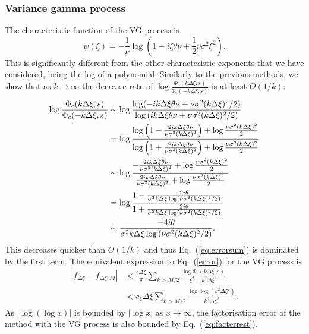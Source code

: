 \documentclass[11pt,a4paper]{article}
\begin{document}
\subsubsection{Variance gamma process}\label{sec:error_fact_VG}

The characteristic function of the VG process is
\begin{equation}
\psi(\xi) = -\frac{1}{\nu}\log\left(1-i\xi\theta\nu+\frac{1}{2}\nu\sigma^2\xi^2\right).
\end{equation}
This is significantly different from the other characteristic exponents that we have considered, being the log of a polynomial. Similarly to the previous methods, we show that as $k\rightarrow\infty$ the decrease rate of $\log \frac{\Phi_{\mathrm{c}}(k\Delta\xi,s)}{\Phi_{\mathrm{c}}(-k\Delta\xi,s)}$ is at least $O(1/k)$:
\begin{align}
\log \frac{\Phi_{\mathrm{c}}(k\Delta\xi,s)}{\Phi_{\mathrm{c}}(-k\Delta\xi,s)}&\sim\log\frac{\log(-ik\Delta\xi\theta\nu+\nu\sigma^2(k\Delta\xi)^2/2)}{\log\left(ik\Delta\xi\theta\nu+\nu\sigma^2(k\Delta\xi)^2/2\right)}\nonumber\\
&=\log\frac{\log\left(1-\frac{2ik\Delta\xi\theta\nu}{\nu\sigma^2(k\Delta\xi)^2}\right)+\log\frac{ \nu\sigma^2(k\Delta\xi)^2}{2}}{\log\left(1+\frac{2ik\Delta\xi\theta\nu}{\nu\sigma^2(k\Delta\xi)^2}\right)+\log\frac{ \nu\sigma^2(k\Delta\xi)^2}{2}}\nonumber\\
&\sim\log\frac{-\frac{2ik\Delta\xi\theta\nu}{\nu\sigma^2(k\Delta\xi)^2}+\log\frac{\nu\sigma^2(k\Delta\xi)^2}{2}}{\frac{2ik\Delta\xi\theta\nu}{\nu\sigma^2(k\Delta\xi)^2}+\log\frac{\nu\sigma^2(k\Delta\xi)^2}{2}}\nonumber\\
&=\log\frac{1-\frac{2i\theta}{\sigma^2k\Delta\xi\log\left( \nu\sigma^2(k\Delta\xi)^2\right/2)}}{1+\frac{2i \theta}{\sigma^2k\Delta\xi\log\left( \nu\sigma^2(k\Delta\xi)^2/2\right)}}\nonumber\\
&\sim\frac{-4i \theta}{\sigma^2 k\Delta \xi\log\left( \nu\sigma^2(k\Delta\xi)^2/2\right)}.
\end{align}
This decreases quicker than $O(1/k)$ and thus Eq.~(\ref{eq:errorsum}) is dominated by the first term. The equivalent expression to Eq.~(\ref{error}) for the VG process is
\begin{align}
|f_{\Delta\xi}-f_{\Delta\xi,M}| &< \frac{c\Delta\xi}{\pi}\sum_{k>M/2}\frac{\log\Phi_{\mathrm{c}}(k\Delta\xi,s)}{\xi^2-k^2\Delta\xi^2}\nonumber\\
& < c_\mathrm{1} \Delta\xi \sum_{k>M/2}\frac{\log\log(k^2 \Delta\xi^2)}{k^2 \Delta\xi^2}.
\end{align}
As $|\log(\log x)|$ is bounded by $|\log x|$ as $x\rightarrow\infty$, the factorisation error of the method with the VG process is also bounded by Eq.~(\ref{eq:facterrest}).
\end{document}
